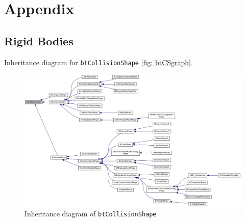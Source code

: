 \section{Appendix}

\subsection{Rigid Bodies}
Inheritance diagram for \texttt{btCollisionShape} \autoref{fig: btCSgraph}.
\begin{figure}[ht]
\centering
\includegraphics[scale=0.2]{img/RigidBodies/btCollisionShapeGraph.png}
\caption{Inheritance diagram of \texttt{btCollisionShape}}
\label{fig: btCSgraph}
\end{figure}